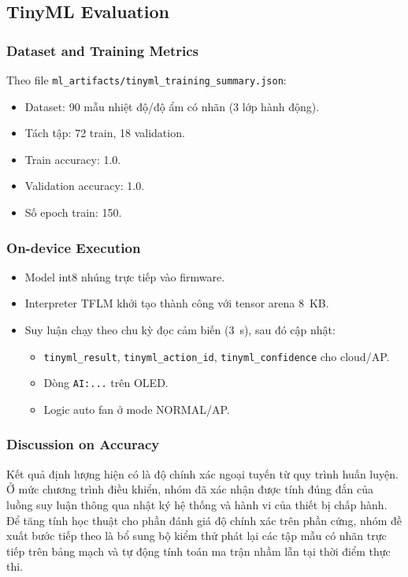 \subsection{TinyML Evaluation}
\subsubsection{Dataset and Training Metrics}
Theo file \texttt{ml\_artifacts/tinyml\_training\_summary.json}:
\begin{itemize}
    \item Dataset: 90 mẫu nhiệt độ/độ ẩm có nhãn (3 lớp hành động).
    \item Tách tập: 72 train, 18 validation.
    \item Train accuracy: 1.0.
    \item Validation accuracy: 1.0.
    \item Số epoch train: 150.
\end{itemize}

\subsubsection{On-device Execution}
\begin{itemize}
    \item Model int8 nhúng trực tiếp vào firmware.
    \item Interpreter TFLM khởi tạo thành công với tensor arena \SI{8}{KB}.
    \item Suy luận chạy theo chu kỳ đọc cảm biến (\SI{3}{s}), sau đó cập nhật:
    \begin{itemize}
        \item \texttt{tinyml\_result}, \texttt{tinyml\_action\_id}, \texttt{tinyml\_confidence} cho cloud/AP.
        \item Dòng \texttt{AI:...} trên OLED.
        \item Logic auto fan ở mode NORMAL/AP.
    \end{itemize}
\end{itemize}

\subsubsection{Discussion on Accuracy}
Kết quả định lượng hiện có là độ chính xác ngoại tuyến từ quy trình huấn luyện. Ở mức chương trình điều khiển, nhóm đã xác nhận được tính đúng đắn của luồng suy luận thông qua nhật ký hệ thống và hành vi của thiết bị chấp hành. Để tăng tính học thuật cho phần đánh giá độ chính xác trên phần cứng, nhóm đề xuất bước tiếp theo là bổ sung bộ kiểm thử phát lại các tập mẫu có nhãn trực tiếp trên bảng mạch và tự động tính toán ma trận nhầm lẫn tại thời điểm thực thi.

